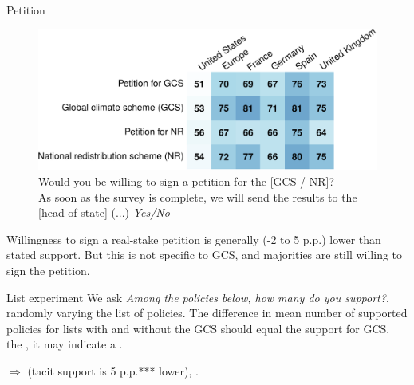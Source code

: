 \begin{framefont}{\small}
\begin{frame}{Petition\label{}}
    \begin{figure}
        \centering 
        \caption{Would you be willing to sign a petition for the [GCS / NR]? \\As soon as the survey is complete, we will send the results to the [head of state] (...) \textit{Yes/No} %
        }
        \vspace{-.2cm}
        \includegraphics[height=.5\textheight]{../figures/country_comparison/petition_positive.pdf} 
    \end{figure}
	\bbvs \ip Willingness to sign a real-stake petition is generally (-2 to 5 p.p.) lower than stated support.
	\ip But this is not specific to GCS, and majorities are still willing to sign the petition.
    \ee
\end{frame}

\begin{frame}{List experiment\label{}}
    \vspace*{-.1cm}
\bbvs \ip We ask \textit{Among the policies below, how many do you support?}, randomly varying the list of policies.
\ip The difference in mean number of supported policies for lists with and without the GCS should equal the support for GCS.  the  , it may indicate a . \pause
\ee
{\footnotesize
    \begin{table}[h]\label{tab:list_exp}\vspace*{-.35cm}
        \makebox[\textwidth][c]{}
      \end{table}
}
$\Rightarrow$  (tacit support is 5 p.p.*** lower), . %
\end{frame}


\end{framefont}
